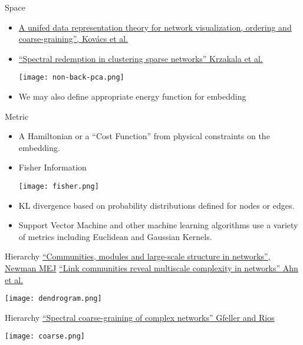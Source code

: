\documentclass{beamer}%
\begin{document}
\begin{frame}{Space}
\begin{itemize}
\item \href{http://www.barabasilab.com/pubs/CCNR-ALB_Publications/201509-08_SciReports-UnifiedData/201509-08_SciReports-UnifiedData.pdf}{A unifed data representation
theory for network visualization,
ordering and coarse-graining'', Kov\'acs et al.}

\item \href{}{``Spectral redemption in clustering sparse networks'' Krzakala et al.}
\centerline{\texttt{[image: non-back-pca.png]}}

\item We may also define appropriate energy function for  embedding

\end{itemize}

\end{frame}

\begin{frame}{Metric}
\begin{itemize}
\item 
A Hamiltonian or a ``Cost Function'' from physical constraints on the embedding. 
\item 
Fisher Information
\centerline{\texttt{[image: fisher.png]}}

\item KL divergence based on probability distributions defined for nodes or edges. 
\item 
Support Vector Machine and other machine learning algorithms use a variety of metrics including Euclidean and Gaussian Kernels. 
\end{itemize}
\end{frame}

\begin{frame}{Hierarchy}
\href{http://www.nature.com/nphys/journal/v8/n1/pdf/nphys2162.pdf}{``Communities, modules and large-scale structure
in networks'', Newman MEJ}
\href{http://www.nature.com/nature/journal/v466/n7307/pdf/nature09182.pdf}{``Link communities reveal multiscale complexity in
networks'' Ahn et al.}


\centerline{\texttt{[image: dendrogram.png]}}

\end{frame}

\begin{frame}{Hierarchy}
\href{http://arxiv.org/pdf/0706.0812v1.pdf}{``Spectral coarse-graining of complex networks'' Gfeller and Rios}
\centerline{\texttt{[image: coarse.png]}}
\end{frame}
\end{document}
